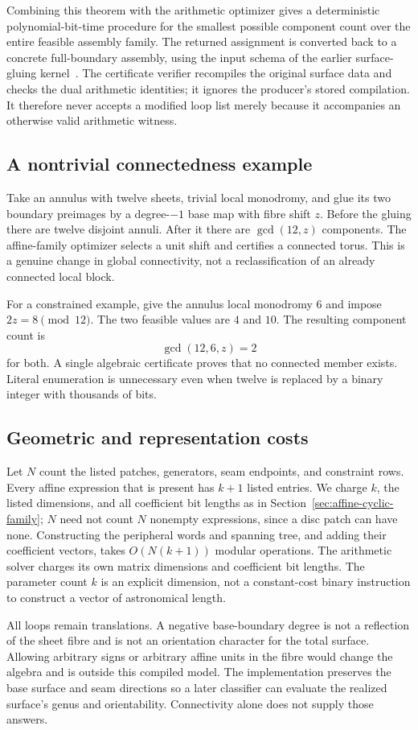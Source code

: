 Combining this theorem with the arithmetic optimizer gives a deterministic
polynomial-bit-time procedure for the smallest possible component count
over the entire feasible assembly family. The returned assignment is
converted back to a concrete full-boundary assembly, using the input
schema of the earlier surface-gluing kernel~\cite{projectors}.
The certificate verifier recompiles the original surface data and checks
the dual arithmetic identities; it ignores the producer's stored
compilation. It therefore never accepts a modified loop list merely
because it accompanies an otherwise valid arithmetic witness.

\subsection{A nontrivial connectedness example}

Take an annulus with twelve sheets, trivial local monodromy, and glue its
two boundary preimages by a degree-$-1$ base map with fibre shift $z$.
Before the gluing there are twelve disjoint annuli. After it there are
$\gcd(12,z)$ components. The affine-family optimizer selects a unit shift
and certifies a connected torus. This is a genuine change in global
connectivity, not a reclassification of an already connected local block.

For a constrained example, give the annulus local monodromy $6$ and
impose $2z=8\pmod{12}$. The two feasible values are $4$ and $10$.
The resulting component count is
\[
 \gcd(12,6,z)=2
\]
for both. A single algebraic certificate proves that no connected member
exists. Literal enumeration is unnecessary even when twelve is replaced
by a binary integer with thousands of bits.

\subsection{Geometric and representation costs}

Let $N$ count the listed patches, generators, seam endpoints, and
constraint rows. Every affine expression that is present has $k+1$ listed entries.
We charge $k$, the listed dimensions, and all coefficient bit lengths as
in Section~\ref{sec:affine-cyclic-family}; $N$ need not count $N$
nonempty expressions, since a disc patch can have none. Constructing the
peripheral words and spanning tree, and adding their coefficient vectors,
takes $O(N(k+1))$ modular operations. The arithmetic solver charges its
own matrix dimensions and coefficient bit lengths. The parameter count
$k$ is an explicit dimension, not a constant-cost binary instruction to
construct a vector of astronomical length.

All loops remain translations. A negative base-boundary degree is not a
reflection of the sheet fibre and is not an orientation character for
the total surface. Allowing arbitrary signs or arbitrary affine units in
the fibre would change the algebra and is outside this compiled model.
The implementation preserves the base surface and seam directions so a
later classifier can evaluate the realized surface's genus and
orientability. Connectivity alone does not supply those answers.
